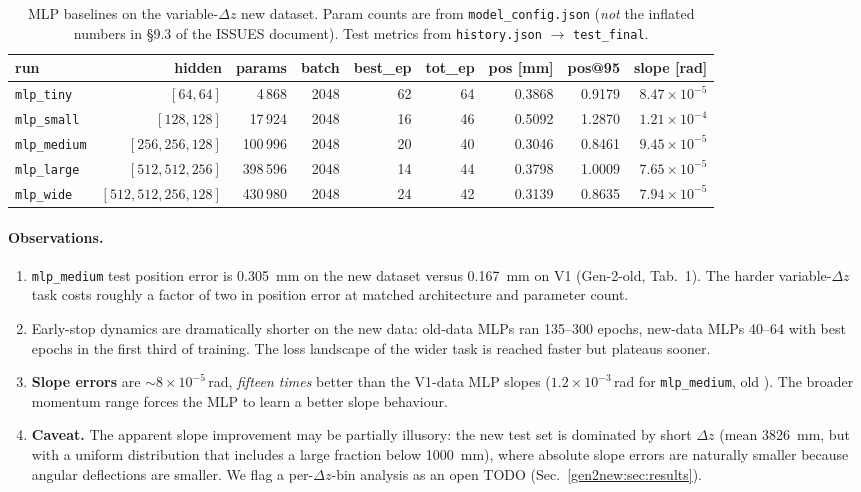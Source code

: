 \documentclass[a4paper,11pt]{article}
\newcommand{\SI}[2]{#1~#2}
\newcommand{\dz}{\Delta z}
\begin{document}
\begin{table}[htbp]
\centering
\small
\caption{MLP baselines on the variable-$\dz$ new dataset. Param
counts are from \texttt{model\_config.json} (\emph{not} the inflated
numbers in \S9.3 of the ISSUES document). Test metrics from
\texttt{history.json} $\to$ \texttt{test\_final}.}
\label{gen2new:tab:mlp}
\begin{tabular}{lrrrrrrrr}
\toprule
run & hidden & params & batch & best\_ep & tot\_ep & pos [mm] & pos@95 & slope [rad] \\
\midrule
\texttt{mlp\_tiny}   & $[64,64]$          &   4\,868 & 2048 & 62 & 64 & 0.3868 & 0.9179 & $8.47\!\times\!10^{-5}$ \\
\texttt{mlp\_small}  & $[128,128]$        &  17\,924 & 2048 & 16 & 46 & 0.5092 & 1.2870 & $1.21\!\times\!10^{-4}$ \\
\texttt{mlp\_medium} & $[256,256,128]$    & 100\,996 & 2048 & 20 & 40 & 0.3046 & 0.8461 & $9.45\!\times\!10^{-5}$ \\
\texttt{mlp\_large}  & $[512,512,256]$    & 398\,596 & 2048 & 14 & 44 & 0.3798 & 1.0009 & $7.65\!\times\!10^{-5}$ \\
\texttt{mlp\_wide}   & $[512,512,256,128]$& 430\,980 & 2048 & 24 & 42 & 0.3139 & 0.8635 & $7.94\!\times\!10^{-5}$ \\
\bottomrule
\end{tabular}
\end{table}

\paragraph{Observations.}
\begin{enumerate}
\item \texttt{mlp\_medium} test position error is \SI{0.305}{mm} on
  the new dataset versus \SI{0.167}{mm} on V1 (Gen-2-old,
  \cite{gen2oldreport} Tab.~1). The harder variable-$\dz$ task
  costs roughly a factor of two in position error at matched
  architecture and parameter count.
\item Early-stop dynamics are dramatically shorter on the new data:
  old-data MLPs ran 135--300 epochs, new-data MLPs 40--64 with best
  epochs in the first third of training. The loss landscape of the
  wider task is reached faster but plateaus sooner.
\item \textbf{Slope errors} are ${\sim}8\!\times\!10^{-5}$\,rad,
  {\it fifteen times} better than the V1-data MLP slopes
  ($1.2\!\times\!10^{-3}$\,rad for \texttt{mlp\_medium}, old
  \cite{gen2oldreport}). The broader momentum range forces the MLP
  to learn a better slope behaviour.
\item \textbf{Caveat.} The apparent slope improvement may be
  partially illusory: the new test set is dominated by short $\dz$
  (mean \SI{3826}{mm}, but with a uniform distribution that includes
  a large fraction below \SI{1000}{mm}), where absolute slope errors
  are naturally smaller because angular deflections are smaller.
  We flag a per-$\dz$-bin analysis as an open TODO
  (Sec.~\ref{gen2new:sec:results}).
\end{enumerate}
\end{document}

